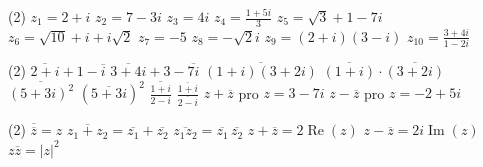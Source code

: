 \documentclass[12pt,a4paper]{article}
\begin{document}
\begin{exercise}
    \begin{tasks}(2)
        \task $z_1=2+i$
        \task $z_2=7-3i$
        \task $z_3=4i$
        \task $\displaystyle z_4=\frac{1+5i}{3}$
        \task $z_5=\sqrt{3}+1-7i$
        \task $z_6=\sqrt{10}+i+i\sqrt2$
        \task $z_7=-5$
        \task $z_8=-\sqrt2 i$
        \task $z_9=(2+i)(3-i)$
        \task $\displaystyle z_{10}=\frac{3+4i}{1-2i}$
    \end{tasks}
\end{exercise}


\begin{exercise}[Vypočítejte]
    \begin{tasks}(2)
        \task $\overline{2+i}+1-\overline{i}$
        \task $\overline{3+4i}+3-\overline{7i}$
        \task $\overline{(1+i)(3+2i)}$
        \task $\overline{(1+i)}\cdot\overline{(3+2i)}$
        \task $\overline{(5+3i)^2}$
        \task $\left(\overline{5+3i}\right)^2$
        \task $\displaystyle \overline{\frac{1+i}{2-i}}$
        \task $\displaystyle \frac{\overline{1+i}}{\overline{2-i}}$
        \task $z+\overline z$ pro $z=3-7i$
        \task $z-\overline z$ pro $z=-2+5i$
    \end{tasks}
\end{exercise}


\begin{exercise}
        \begin{tasks}(2)
            \task $\overline{\overline z}=z$
            \task $\overline{z_1+z_2}=\overline{z_1}+\overline{z_2}$
            \task $\overline{z_1z_2}=\overline{z_1}\,\overline{z_2}$
            \task $z+\overline z=2\operatorname{Re}(z)$
            \task $z-\overline z=2i\operatorname{Im}(z)$
            \task $z\overline z=|z|^2$
        \end{tasks}
\end{exercise}




\end{document}
